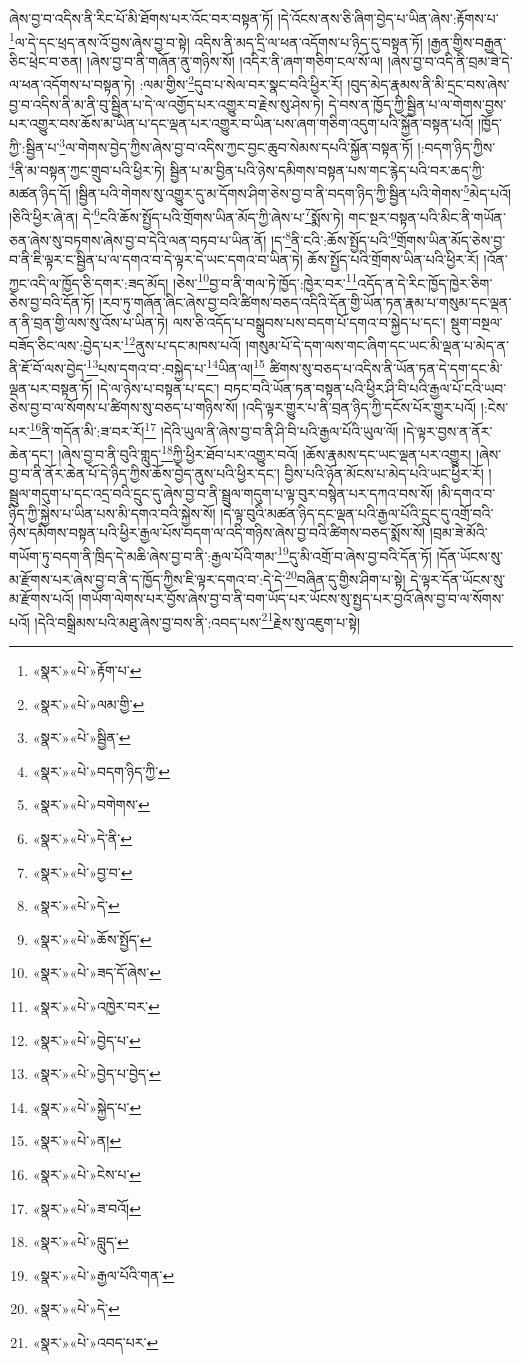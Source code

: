 ཞེས་བྱ་བ་འདིས་ནི་རིང་པོ་མི་ཐོགས་པར་འོང་བར་བསྟན་ཏོ། །དེ་འོངས་ནས་ཅི་ཞིག་བྱེད་པ་ཡིན་ཞེས་:རྟོགས་པ་\footnote{«སྣར་»«པེ་»རྟོག་པ་}ལ་དེ་དང་ཕྲད་ནས་འོ་བྱས་ཞེས་བྱ་བ་སྟེ། འདིས་ནི་མད་དྲི་ལ་ཕན་འདོགས་པ་ཉིད་དུ་བསྟན་ཏོ། །རྒྱན་གྱིས་བརྒྱན་ཅིང་ཕྲེང་བ་ཅན། །ཞེས་བྱ་བ་ནི་གཞོན་ནུ་གཉིས་སོ། །འདིར་ནི་ཞག་གཅིག་ངལ་སོ་ལ། །ཞེས་བྱ་བ་འདི་ནི་བྲམ་ཟེ་དེ་ལ་ཕན་འདོགས་པ་བསྟན་ཏེ། :ལམ་གྱིས་\footnote{«སྣར་»«པེ་»ལམ་གྱི་}དུབ་པ་སེལ་བར་སྣང་བའི་ཕྱིར་རོ། །བུད་མེད་རྣམས་ནི་མི་དྲང་བས་ཞེས་བྱ་བ་འདིས་ནི་མ་ནི་བུ་སྦྱིན་པ་དེ་ལ་འགྱོད་པར་འགྱུར་བ་རྗེས་སུ་ཤེས་ཏེ། དེ་བས་ན་ཁྱོད་ཀྱི་སྦྱིན་པ་ལ་གེགས་བྱས་པར་འགྱུར་བས་ཆོས་མ་ཡིན་པ་དང་ལྡན་པར་འགྱུར་བ་ཡིན་པས་ཞག་གཅིག་འདུག་པའི་སྐྱོན་བསྟན་པའོ། །ཁྱོད་ཀྱི་:སྦྱིན་པ་\footnote{«སྣར་»«པེ་»སྦྱིན་}ལ་གེགས་བྱེད་ཀྱིས་ཞེས་བྱ་བ་འདིས་ཀྱང་བྱང་ཆུབ་སེམས་དཔའི་སྐྱོན་བསྟན་ཏོ། །:བདག་ཉིད་ཀྱིས་\footnote{«སྣར་»«པེ་»བདག་ཉིད་ཀྱི་}ནི་མ་བསྟན་ཀྱང་གྲུབ་པའི་ཕྱིར་ཏེ། སྦྱིན་པ་མ་བྱིན་པའི་ཉེས་དམིགས་བསྟན་པས་གང་རྙེད་པའི་བར་ཆད་ཀྱི་མཚན་ཉིད་དོ། །སྦྱིན་པའི་གེགས་སུ་འགྱུར་དུ་མ་དོགས་ཤིག་ཅེས་བྱ་བ་ནི་བདག་ཉིད་ཀྱི་སྦྱིན་པའི་གེགས་\footnote{«སྣར་»«པེ་»བགེགས་}མེད་པའོ། །ཅིའི་ཕྱིར་ཞེ་ན། དེ་\footnote{«སྣར་»«པེ་»དེ་ནི་}ངའི་ཆོས་སྤྱོད་པའི་གྲོགས་ཡིན་མོད་ཀྱི་ཞེས་པ་\footnote{«སྣར་»«པེ་»བྱ་བ་}སྨོས་ཏེ། གང་སྔར་བསྟན་པའི་མིང་ནི་གཡོན་ཅན་ཞེས་སུ་བཏགས་ཞེས་བྱ་བ་དེའི་ལན་བཏབ་པ་ཡིན་ནོ། །ད་\footnote{«སྣར་»«པེ་»དེ་}ནི་ངའི་:ཆོས་སྤྱོད་པའི་\footnote{«སྣར་»«པེ་»ཆོས་སྤྱོད་}གྲོགས་ཡིན་མོད་ཅེས་བྱ་བ་ནི་ཇི་ལྟར་ང་སྦྱིན་པ་ལ་དགའ་བ་དེ་ལྟར་དེ་ཡང་དགའ་བ་ཡིན་ཏེ། ཆོས་སྤྱོད་པའི་གྲོགས་ཡིན་པའི་ཕྱིར་རོ། །འོན་ཀྱང་འདི་ལ་ཁྱོད་ཅི་དགར་:ཟད་མོད། །ཅེས་\footnote{«སྣར་»«པེ་»ཟད་དོ་ཞེས་}བྱ་བ་ནི་གལ་ཏེ་ཁྱོད་:ཁྱེར་བར་\footnote{«སྣར་»«པེ་»འཁྱེར་བར་}འདོད་ན་དེ་རིང་ཁྱོད་ཁྱེར་ཅིག་ཅེས་བྱ་བའི་དོན་ཏོ། །རབ་ཏུ་གཞོན་ཞིང་ཞེས་བྱ་བའི་ཚིགས་བཅད་འདིའི་དོན་གྱི་ཡོན་ཏན་རྣམ་པ་གསུམ་དང་ལྡན་ན་ནི་བྲན་གྱི་ལས་སུ་འོས་པ་ཡིན་ཏེ། ལས་ཅི་འདོད་པ་བསྒྲུབས་པས་བདག་པོ་དགའ་བ་སྐྱེད་པ་དང་། སྡུག་བསྔལ་བཟོད་ཅིང་ལས་:བྱེད་པར་\footnote{«སྣར་»«པེ་»བྱེད་པ་}ནུས་པ་དང་མཁས་པའོ། །གསུམ་པོ་དེ་དག་ལས་གང་ཞིག་དང་ཡང་མི་ལྡན་པ་མེད་ན་ནི་ཇོ་བོ་ལས་བྱེད་\footnote{«སྣར་»«པེ་»བྱེད་པ་བྱེད་}པས་དགའ་བ་:བསྐྱེད་པ་\footnote{«སྣར་»«པེ་»སྐྱེད་པ་}ཡིན་ལ།\footnote{«སྣར་»«པེ་»ན།} ཚིགས་སུ་བཅད་པ་འདིས་ནི་ཡོན་ཏན་དེ་དག་དང་མི་ལྡན་པར་བསྟན་ཏོ། །དེ་ལ་ཉེས་པ་བསྟན་པ་དང་། བཏང་བའི་ཡོན་ཏན་བསྟན་པའི་ཕྱིར་ཤི་བི་པའི་རྒྱལ་པོ་ངའི་ཡབ་ཅེས་བྱ་བ་ལ་སོགས་པ་ཚིགས་སུ་བཅད་པ་གཉིས་སོ། །འདི་ལྟར་གྱུར་པ་ནི་བྲན་ཉིད་ཀྱི་དངོས་པོར་གྱུར་པའོ། །:ངེས་པར་\footnote{«སྣར་»«པེ་»ངེས་པ་}ནི་གདོན་མི་:ཟ་བར་རོ།\footnote{«སྣར་»«པེ་»ཟ་བའོ།} །དེའི་ཡུལ་ནི་ཞེས་བྱ་བ་ནི་ཤི་བི་པའི་རྒྱལ་པོའི་ཡུལ་ལོ། །དེ་ལྟར་བྱས་ན་ནོར་ཆེན་དང་། །ཞེས་བྱ་བ་ནི་བུའི་གླུད་\footnote{«སྣར་»«པེ་»བླུད་}ཀྱི་ཕྱིར་ཐོབ་པར་འགྱུར་བའོ། །ཆོས་རྣམས་དང་ཡང་ལྡན་པར་འགྱུར། །ཞེས་བྱ་བ་ནི་ནོར་ཆེན་པོ་དེ་ཉིད་ཀྱིས་ཆོས་བྱེད་ནུས་པའི་ཕྱིར་དང་། བྱིས་པའི་ཉོན་མོངས་པ་མེད་པའི་ཡང་ཕྱིར་རོ། །སྦྲུལ་གདུག་པ་དང་འདྲ་བའི་དྲུང་དུ་ཞེས་བྱ་བ་ནི་སྦྲུལ་གདུག་པ་ལྟ་བུར་བསྙེན་པར་དཀའ་བས་སོ། །མི་དགའ་བ་ཉིད་ཀྱི་སྐྱེས་པ་ཡིན་པས་མི་དགའ་བའི་སྐྱེས་སོ། །དེ་ལྟ་བུའི་མཚན་ཉིད་དང་ལྡན་པའི་རྒྱལ་པོའི་དྲུང་དུ་འགྲོ་བའི་ཉེས་དམིགས་བསྟན་པའི་ཕྱིར་རྒྱལ་པོས་བདག་ལ་འདི་གཉིས་ཞེས་བྱ་བའི་ཚིགས་བཅད་སྨོས་སོ། །བྲམ་ཟེ་མོའི་གཡོག་ཏུ་བདག་ནི་ཁྲིད་དེ་མཆི་ཞེས་བྱ་བ་ནི་:རྒྱལ་པོའི་གམ་\footnote{«སྣར་»«པེ་»རྒྱལ་པོའི་གན་}དུ་མི་འགྲོ་བ་ཞེས་བྱ་བའི་དོན་ཏོ། །དོན་ཡོངས་སུ་མ་རྫོགས་པར་ཞེས་བྱ་བ་ནི་ད་ཁྱོད་ཀྱིས་ཇི་ལྟར་དགའ་བ་:དེ་དེ་\footnote{«སྣར་»«པེ་»དེ་}བཞིན་དུ་གྱིས་ཤིག་པ་སྟེ། དེ་ལྟར་དོན་ཡོངས་སུ་མ་རྫོགས་པའོ། །གཡོག་ལེགས་པར་བྱོས་ཞེས་བྱ་བ་ནི་བག་ཡོད་པར་ཡོངས་སུ་སྤྱད་པར་བྱའོ་ཞེས་བྱ་བ་ལ་སོགས་པའོ། །དེའི་བསྒྲིམས་པའི་མཐུ་ཞེས་བྱ་བས་ནི་:འབད་པས་\footnote{«སྣར་»«པེ་»འབད་པར་}རྗེས་སུ་འཇུག་པ་སྟེ། 